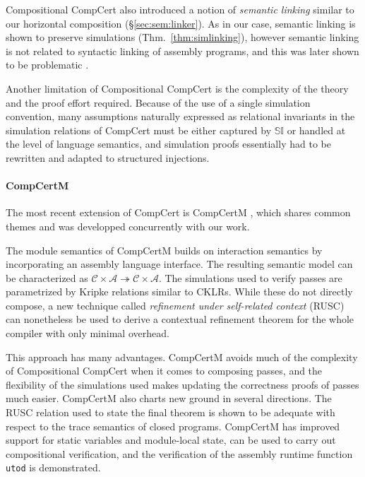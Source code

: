 \documentclass[acmsmall,authordraft]{acmart}
\begin{document}
Compositional CompCert also introduced a notion of \emph{semantic linking}
similar to our horizontal composition
(\S\ref{sec:sem:linker}).
As in our case,
semantic linking is shown to preserve simulations
(Thm.~\ref{thm:simlinking}),
however semantic linking is not related to
syntactic linking of assembly programs,
and this was later shown to be problematic \cite{compcertm}.

Another limitation of Compositional CompCert
is the complexity of the theory
and the proof effort required.
Because of the use of a single simulation convention,
many assumptions naturally expressed as
relational invariants in the simulation relations of CompCert
must be either captured by $\mathbb{SI}$
or handled at the level of language semantics,
and simulation proofs
essentially had to be rewritten and adapted to
structured injections.


\paragraph{CompCertM} %

The most recent extension of CompCert is CompCertM \cite{compcertm},
which shares common themes and was developped concurrently
with our work.

The module semantics of CompCertM
builds on interaction semantics
by incorporating an assembly language interface.
The resulting semantic model can be characterized as
$\mathcal{C} \times \mathcal{A} \twoheadrightarrow
 \mathcal{C} \times \mathcal{A}$.
The simulations used to verify passes
are parametrized by Kripke relations similar to CKLRs.
While these do not directly compose,
a new technique called \emph{refinement under self-related context}
(RUSC)
can nonetheless be used to derive a contextual refinement theorem
for the whole compiler with only minimal overhead.

This approach has many advantages.
CompCertM avoids much of the complexity
of Compositional CompCert
when it comes to composing passes,
and the flexibility of the simulations used
makes updating the correctness proofs of passes much easier.
CompCertM also charts new ground in several directions.
The RUSC relation used to state the final theorem
is shown to be adequate with respect to the trace semantics
of closed programs.
CompCertM has improved support for static variables
and module-local state,
can be used to carry out compositional verification,
and the verification of
the assembly runtime function \texttt{utod} is demonstrated.
\end{document}

